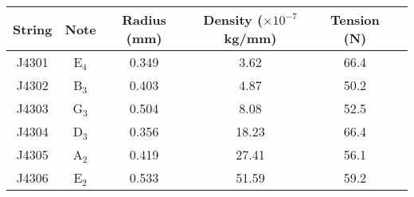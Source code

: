\begin{tabular}{cccccc}
\toprule
String & Note & Radius (mm) & Density ($\times 10^{-7}$ kg/mm) & Tension (N) \\
\midrule
J4301 & E$_{4}$ & 0.349 & 3.62 & 66.4 \\
J4302 & B$_{3}$ & 0.403 & 4.87 & 50.2 \\
J4303 & G$_{3}$ & 0.504 & 8.08 & 52.5 \\
J4304 & D$_{3}$ & 0.356 & 18.23 & 66.4 \\
J4305 & A$_{2}$ & 0.419 & 27.41 & 56.1 \\
J4306 & E$_{2}$ & 0.533 & 51.59 & 59.2 \\
\bottomrule
\end{tabular}

